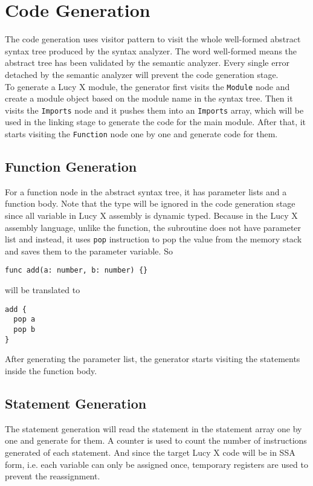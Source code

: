 \section{Code Generation}
The code generation uses visitor pattern to visit the whole well-formed abstract syntax tree produced by the syntax analyzer. The word well-formed means the abstract tree has been validated by the semantic analyzer. Every single error detached by the semantic analyzer will prevent the code generation stage. \\
To generate a Lucy X module, the generator first visits the \texttt{Module} node and create a module object based on the module name in the syntax tree. Then it visits the \texttt{Imports} node and it pushes them into an \texttt{Imports} array, which will be used in the linking stage to generate the code for the main module. After that, it starts visiting the \texttt{Function} node one by one and generate code for them. \\
\subsection{Function Generation}
For a function node in the abstract syntax tree, it has parameter lists and a function body. Note that the type will be ignored in the code generation stage since all variable in Lucy X assembly is dynamic typed. Because in the Lucy X assembly language, unlike the function, the subroutine does not have parameter list and instead, it uses \texttt{pop} instruction to pop the value from the memory stack and saves them to the parameter variable. So
\begin{lstlisting}
func add(a: number, b: number) {}
\end{lstlisting}
will be translated to
\begin{lstlisting}[language=LucyX]
add {
  pop a
  pop b
}
\end{lstlisting}
After generating the parameter list, the generator starts visiting the statements inside the function body.
\subsection{Statement Generation}
The statement generation will read the statement in the statement array one by one and generate for them. A counter is used to count the number of instructions generated of each statement. And since the target Lucy X code will be in SSA form, i.e. each variable can only be assigned once, temporary registers are used to prevent the reassignment.
